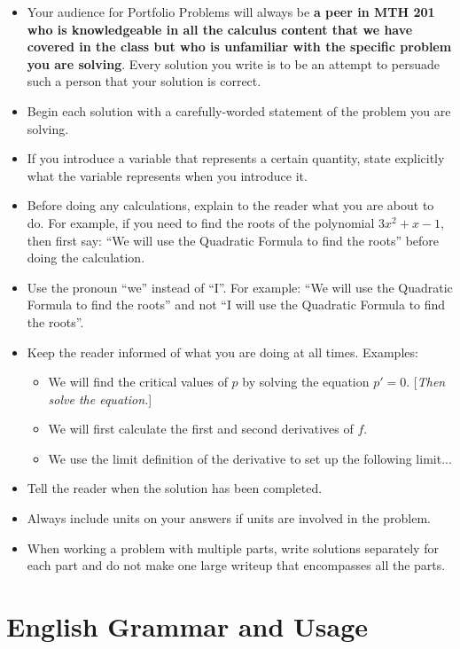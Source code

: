 \documentclass[11pt]{article}
\begin{document}
\begin{itemize}
	\item Your audience for Portfolio Problems will always be \textbf{a peer in MTH 201 who is knowledgeable in all the calculus content that we have covered in the class but who is unfamiliar with the specific problem you are solving}. Every solution you write is to be an attempt to persuade such a person that your solution is correct. 
	\item Begin each solution with a carefully-worded statement of the problem you are solving. 
	\item If you introduce a variable that represents a certain quantity, state explicitly what the variable represents when you introduce it. 
	\item Before doing any calculations, explain to the reader what you are about to do. For example, if you need to find the roots of the polynomial $3x^2 + x - 1$, then first say: ``We will use the Quadratic Formula to find the roots'' before doing the calculation. 
	\item Use the pronoun ``we'' instead of ``I''. For example: ``We will use the Quadratic Formula to find the roots'' and not ``I will use the Quadratic Formula to find the roots''. 
	\item Keep the reader informed of what you are doing at all times. Examples: 
	\begin{itemize}
		\item We will find the critical values of $p$ by solving the equation $p' = 0$. [\emph{Then solve the equation.}]
		\item We will first calculate the first and second derivatives of $f$. 
		\item We use the limit definition of the derivative to set up the following limit... 
	\end{itemize}
	\item Tell the reader when the solution has been completed. 
	\item Always include units on your answers if units are involved in the problem. 
	\item When working a problem with multiple parts, write solutions separately for each part and do not make one large writeup that encompasses all the parts. 
	
	
\end{itemize}


\section*{English Grammar and Usage}
\end{document}
